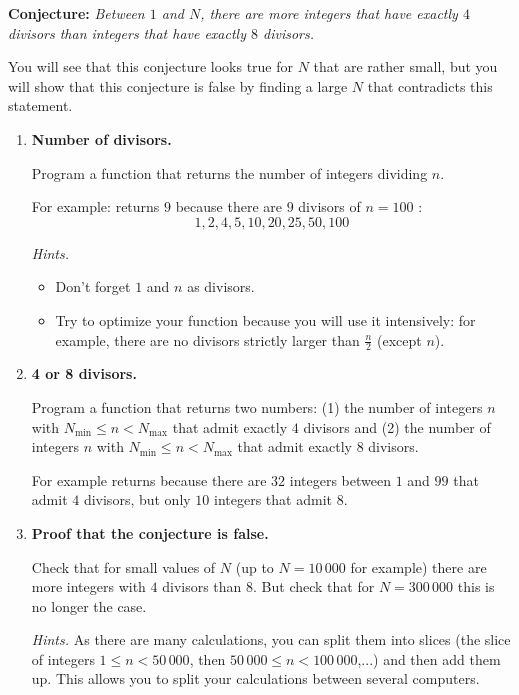 \documentclass[11pt,class=report,crop=false]{standalone}
\begin{document}
\begin{activite}


\textbf{Conjecture: } \emph{Between $1$ and $N$, there are more integers that have exactly $4$ divisors than integers that have exactly $8$ divisors.}

You will see that this conjecture looks true for $N$ that are rather small, but you will show that this conjecture is false by finding a large $N$ that contradicts this statement.

\begin{enumerate}
  \item \textbf{Number of divisors.}
  
  Program a  function that returns the number of integers dividing $n$.
  
  For example:  returns $9$ because there are $9$ divisors of $n=100$ :
  $$1,2,4,5,10,20,25,50,100$$
  
  \emph{Hints.}
  \begin{itemize}
    \item Don't forget $1$ and $n$ as divisors.
    \item Try to optimize your function because you will use it intensively: for example, there are no divisors strictly larger than $\frac n2$ (except $n$).    
   \end{itemize}
   
   
   \item \textbf{4 or 8 divisors.}
   
   Program a  function that returns two numbers: (1) the number of integers $n$ with $N_{\text{min}} \le n < N_{\text{max}}$ that admit exactly $4$ divisors and (2) the number of integers $n$ with $N_{\text{min}} \le n < N_{\text{max}}$ that admit exactly $8$ divisors.
   
   For example  returns  because there are $32$ integers between $1$ and $99$ that admit $4$ divisors, but only $10$ integers that admit $8$.
   
   \item \textbf{Proof that the conjecture is false.}
   
   Check that for \og{}small\fg{} values of $N$ (up to $N = 10\,000$ for example) there are more integers with $4$ divisors than $8$. But check that for $N=300\,000$ this is no longer the case.
   
   \emph{Hints.} As there are many calculations, you can split them into slices (the slice of integers $1\le n < 50\,000$, then $50\,000 \le n < 100\,000$,...) and then add them up.
   This allows you to split your calculations between several computers.
   
\end{enumerate}   
     
\end{activite}
\end{document}
